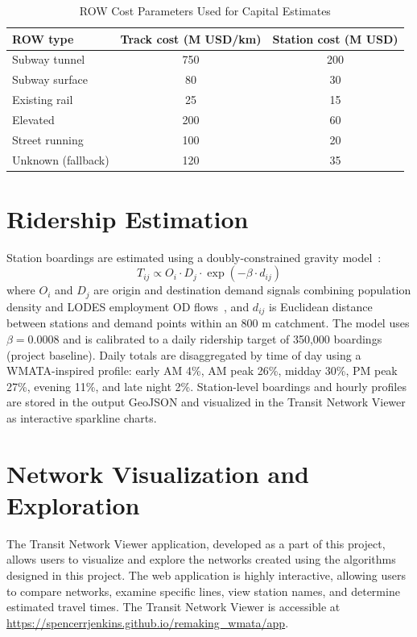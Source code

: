 \documentclass[sigconf,nonacm]{acmart}
\begin{document}
\begin{table}[h]
\caption{ROW Cost Parameters Used for Capital Estimates}
\label{tab:rowcosts}
\begin{tabular}{lcc}
\toprule
\textbf{ROW type} & \textbf{Track cost (M USD/km)} & \textbf{Station cost (M USD)} \\
\midrule
Subway tunnel & 750 & 200 \\
Subway surface & 80 & 30 \\
Existing rail & 25 & 15 \\
Elevated & 200 & 60 \\
Street running & 100 & 20 \\
Unknown (fallback) & 120 & 35 \\
\bottomrule
\end{tabular}
\end{table}

\section{Ridership Estimation}

Station boardings are estimated using a doubly-constrained gravity model~\cite{wilson1971gravity}:
\[
  T_{ij} \propto O_i \cdot D_j \cdot \exp(-\beta \cdot d_{ij})
\]
where $O_i$ and $D_j$ are origin and destination demand signals combining population density and LODES employment OD flows~\cite{lodes2023}, and $d_{ij}$ is Euclidean distance between stations and demand points within an 800 m catchment. The model uses $\beta = 0.0008$ and is calibrated to a daily ridership target of 350{,}000 boardings (project baseline). Daily totals are disaggregated by time of day using a WMATA-inspired profile: early AM 4\%, AM peak 26\%, midday 30\%, PM peak 27\%, evening 11\%, and late night 2\%. Station-level boardings and hourly profiles are stored in the output GeoJSON and visualized in the Transit Network Viewer as interactive sparkline charts.

\section{Network Visualization and Exploration}

The Transit Network Viewer application, developed as a part of this project, allows users to visualize and explore the networks created using the algorithms designed in this project. The web application is highly interactive, allowing users to compare networks, examine specific lines, view station names, and determine estimated travel times. The Transit Network Viewer is accessible at \url{https://spencerrjenkins.github.io/remaking_wmata/app}.
\end{document}
